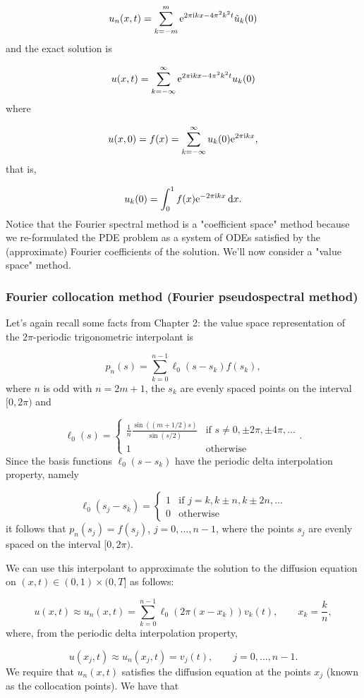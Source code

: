 \documentclass[12pt,landscape]{article}
\begin{document}
{\[
u_n(x,t) = \sum_{k=-m}^{m}  {\rm e}^{2\pi{\rm i}kx-4\pi^2 k^2 t} \tilde{u}_k(0)
\]
and the exact solution is

\[
u(x,t) = \sum_{k=-\infty}^{\infty}  {\rm e}^{2\pi{\rm i}kx-4\pi^2 k^2 t} u_k(0)
\]
where

\[
u(x,0) = f(x) = \sum_{k=-\infty}^{\infty}u_k(0) {\rm e}^{2\pi{\rm i}kx },
\]
that is,

\[
u_k(0) = \int_{0}^{1} f(x){\rm e}^{-2\pi{\rm i}kx}\,{\rm d}x.
\]
Notice that the Fourier spectral method is a "coefficient space" method because we re-formulated the PDE problem as a system of ODEs satisfied by the (approximate) Fourier coefficients of the solution.  We'll now consider a "value space" method.  

\subsubsection{Fourier collocation method (Fourier pseudospectral method)}
Let's again recall some facts from Chapter 2: the value space representation of the $2\pi$-periodic trigonometric interpolant is

\[
p_n(s) = \sum_{k=0}^{n-1}\ell_0(s-s_k)f(s_k), 
\]
where $n$ is odd with $n = 2m + 1$, the $s_k$ are evenly spaced points on the interval $[0, 2\pi)$ and

\[
\ell_0(s) = \begin{cases}
\displaystyle{\frac{1}{n}\frac{\sin((m+1/2)s)}{\sin(s/2)}} & \text{if } s \neq 0, \pm 2\pi, \pm 4\pi, \ldots \\
1 & \text{otherwise}
\end{cases}.
\]
Since the basis functions $\ell_0(s-s_k)$ have the periodic delta interpolation property, namely

\[
\ell_0(s_j-s_k) = \begin{cases}
1 & \text{if } j = k, k \pm n, k \pm 2n, \ldots \\
0 & \text{otherwise}
\end{cases}
\]
it follows that $p_n(s_j) = f(s_j)$, $j = 0, \ldots, n-1$, where the points $s_j$ are evenly spaced on the interval $[0, 2\pi)$.

We can use this interpolant to approximate the solution to the diffusion equation on $(x,t) \in (0,1)\times (0, T]$ as follows: 

\[
u(x,t) \approx u_n(x,t) = \sum_{k=0}^{n-1}\ell_0(2\pi (x- x_k))v_k(t), \qquad x_k = \frac{k}{n},
\]
where, from the periodic delta interpolation property,

\[
u(x_j,t) \approx u_n(x_j,t) = v_j(t), \qquad j = 0, \ldots, n-1.
\]
We require that $u_n(x,t)$ satisfies the diffusion equation at the points $x_j$ (known as the collocation points). We have that

}
\end{document}
